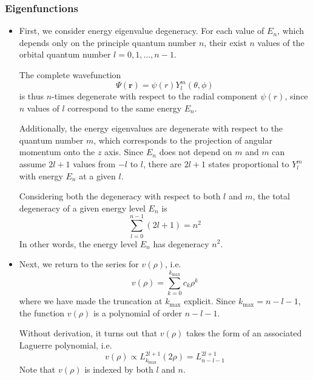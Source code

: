 \documentclass[11pt, a4paper]{article}
\renewcommand{\vec}[1]{\bm{#1}}  %
\renewcommand{\r}{\vec{r}}  %
\newcommand{\p}{\psi}  %
\renewcommand{\P}{\Psi}  %
\begin{document}
\subsubsection{Eigenfunctions}
\begin{itemize}
	\item First, we consider energy eigenvalue degeneracy. For each value of $ E_{n} $, which depends only on the principle quantum number $ n $, their exist $ n $ values of the orbital quantum number $ l = 0, 1, \ldots, n-1 $. 
	
	The complete wavefunction 
	\begin{equation*}
		\P(\r) = \p(r)Y_{l}^{m}(\theta, \phi) 
	\end{equation*}
	is thus $ n $-times degenerate with respect to the radial component $ \p(r) $, since $ n $ values of $ l $ correspond to the same energy $ E_{n} $. 
	
	Additionally, the energy eigenvalues are degenerate with respect to the quantum number $ m $, which corresponds to the projection of angular momentum onto the $ z $ axis. Since $ E_{n} $ does not depend on $ m $ and $ m $ can assume $ 2l + 1 $ values from $ -l $ to $ l $, there are $ 2l + 1 $ states proportional to $ Y_{l}^{m} $ with energy $ E_{n} $ at a given $ l $.  
	
	Considering both the degeneracy with respect to both $ l $ and $ m $, the total degeneracy of a given energy level $ E_{n} $ is
	\begin{equation*}
		\sum_{l = 0}^{n-1}(2l+1) = n^{2}
	\end{equation*}
	In other words, the energy level $ E_{n} $ has degeneracy $ n^{2} $. 
	
	\item Next, we return to the series for $ v(\rho) $, i.e.
	\begin{equation*}
		v(\rho) = \sum_{k = 0}^{k_{\text{max}}} c_{k}\rho^{k}
	\end{equation*}
	where we have made the truncation at $ k_{\text{max}} $ explicit. Since $ k_{\text{max}} = n - l - 1 $, the function $ v(\rho) $ is a polynomial of order $ n - l - 1 $. 
	
	Without derivation, it turns out that $ v(\rho) $ takes the form of an associated Laguerre polynomial, i.e.
	\begin{equation*}
		v(\rho) \propto L_{k_{\text{max}}}^{2l+1}(2\rho) = L_{n - l - 1}^{2l + 1}
	\end{equation*}
	Note that $ v(\rho) $ is indexed by both $ l $ and $ n $.
	

\end{itemize}
\end{document}
